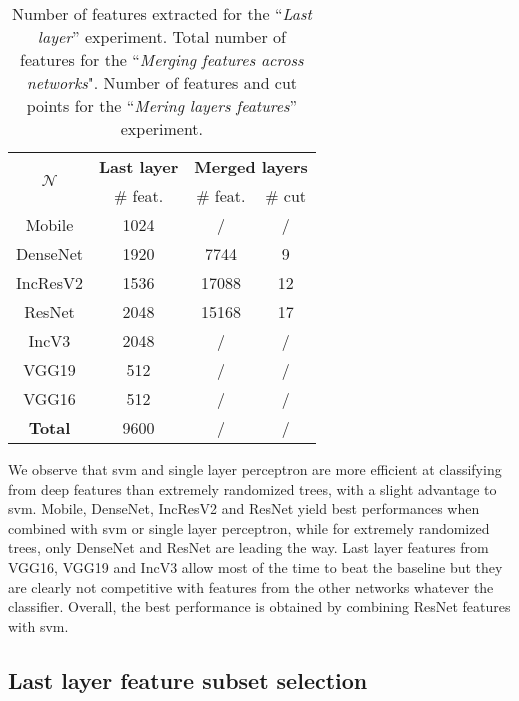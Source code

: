 \begin{table}
    \center 
    \begin{tabular}{|c|c|c|c|}
        \hline
        \multirow{2}{*}{$\mathcal{N}$} & \multicolumn{1}{c|}{\textbf{Last layer}} & \multicolumn{2}{c|}{\textbf{Merged layers}} \\
        \cline{2-4}
        & \# feat. & \# feat. & \# cut \\
        \hline
        Mobile & 1024 & / & /\\ 
        DenseNet & 1920 & 7744 & 9 \\ 
        IncResV2 & 1536 & 17088 & 12 \\ 
        ResNet & 2048 & 15168 & 17 \\ 
        IncV3 & 2048 & / & / \\ 
        VGG19 & 512 & / & / \\ 
        VGG16 & 512 & / & / \\  
        \hline
        \textbf{Total} & 9600 & / & / \\
        \hline 
    \end{tabular}
    \caption{Number of features extracted for the ``\textit{Last layer}'' experiment. Total number of features for the ``\textit{Merging features across networks}". Number of features and cut points for the ``\textit{Mering layers features}'' experiment.}
    \label{tab:comp:n_features_per_net}
\end{table}

We observe that \acrshort{svm} and single layer perceptron are more efficient at classifying from deep features than extremely randomized trees, with a slight advantage to \acrshort{svm}. Mobile, DenseNet, IncResV2 and ResNet yield best performances when combined with \acrshort{svm} or single layer perceptron, while for extremely randomized trees, only DenseNet and ResNet are leading the way. Last layer features from VGG16, VGG19 and IncV3 allow most of the time to beat the baseline but they are clearly not competitive with features from the other networks whatever the classifier. Overall, the best performance is obtained by combining ResNet features with \acrshort{svm}.

\subsection{Last layer feature subset selection}
\label{ssec:comp:exp_feat_sel}

